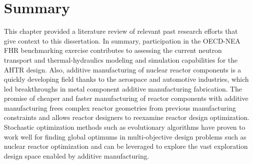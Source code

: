 \section{Summary}
This chapter provided a literature review of relevant past research 
efforts that give context to this dissertation. 
In summary, participation in the \acrfull{OECD}-\acrfull{NEA} \acrfull{FHR} 
benchmarking exercise contributes to assessing the current neutron transport and 
thermal-hydraulics modeling and simulation capabilities for the \acrfull{AHTR} design.
Also, additive manufacturing of nuclear reactor components is a quickly 
developing field thanks to the aerospace and automotive industries, which led 
breakthroughs in metal component additive manufacturing fabrication. 
The promise of cheaper and faster manufacturing of reactor components with 
additive manufacturing frees complex reactor geometries from previous 
manufacturing constraints and allows reactor designers to reexamine reactor 
design optimization.  
Stochastic optimization methods such as evolutionary algorithms have proven to 
work well for finding global optimums in multi-objective design problems such as 
nuclear reactor optimization and can be leveraged to explore the vast exploration 
design space enabled by additive manufacturing.
